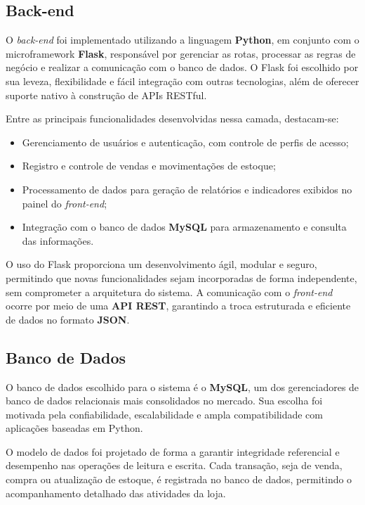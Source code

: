 \subsection{Back-end}

O \textit{back-end} foi implementado utilizando a linguagem \textbf{Python}, em conjunto com o microframework \textbf{Flask}, responsável por gerenciar as rotas, processar as regras de negócio e realizar a comunicação com o banco de dados. O Flask foi escolhido por sua leveza, flexibilidade e fácil integração com outras tecnologias, além de oferecer suporte nativo à construção de APIs RESTful.  

Entre as principais funcionalidades desenvolvidas nessa camada, destacam-se:
\begin{itemize}
    \item Gerenciamento de usuários e autenticação, com controle de perfis de acesso;
    \item Registro e controle de vendas e movimentações de estoque;
    \item Processamento de dados para geração de relatórios e indicadores exibidos no painel do \textit{front-end};
    \item Integração com o banco de dados \textbf{MySQL} para armazenamento e consulta das informações.
\end{itemize}

O uso do Flask proporciona um desenvolvimento ágil, modular e seguro, permitindo que novas funcionalidades sejam incorporadas de forma independente, sem comprometer a arquitetura do sistema. A comunicação com o \textit{front-end} ocorre por meio de uma \textbf{API REST}, garantindo a troca estruturada e eficiente de dados no formato \textbf{JSON}.


\subsection{Banco de Dados}

O banco de dados escolhido para o sistema é o \textbf{MySQL}, um dos gerenciadores de banco de dados relacionais mais consolidados no mercado. Sua escolha foi motivada pela confiabilidade, escalabilidade e ampla compatibilidade com aplicações baseadas em Python.  

O modelo de dados foi projetado de forma a garantir integridade referencial e desempenho nas operações de leitura e escrita. Cada transação, seja de venda, compra ou atualização de estoque, é registrada no banco de dados, permitindo o acompanhamento detalhado das atividades da loja.  

